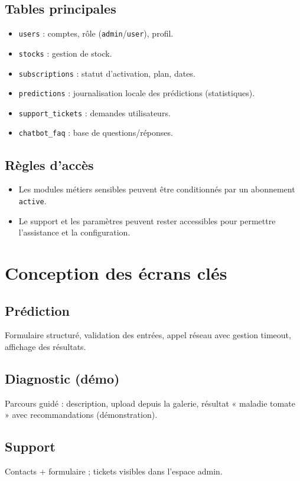 \documentclass[12pt,a4paper,twoside,openright]{report}
\begin{document}
\subsection{Tables principales}
\begin{itemize}
  \item \texttt{users} : comptes, rôle (\texttt{admin}/\texttt{user}), profil.
  \item \texttt{stocks} : gestion de stock.
  \item \texttt{subscriptions} : statut d'activation, plan, dates.
  \item \texttt{predictions} : journalisation locale des prédictions (statistiques).
  \item \texttt{support\_tickets} : demandes utilisateurs.
  \item \texttt{chatbot\_faq} : base de questions/réponses.
\end{itemize}

\subsection{Règles d'accès}
\begin{itemize}
  \item Les modules métiers sensibles peuvent être conditionnés par un abonnement \texttt{active}.
  \item Le support et les paramètres peuvent rester accessibles pour permettre l'assistance et la configuration.
\end{itemize}

\section{Conception des écrans clés}

\subsection{Prédiction}
Formulaire structuré, validation des entrées, appel réseau avec gestion timeout, affichage des résultats.

\subsection{Diagnostic (démo)}
Parcours guidé : description, upload depuis la galerie, résultat « maladie tomate » avec recommandations (démonstration).

\subsection{Support}
Contacts + formulaire ; tickets visibles dans l'espace admin.
\end{document}
